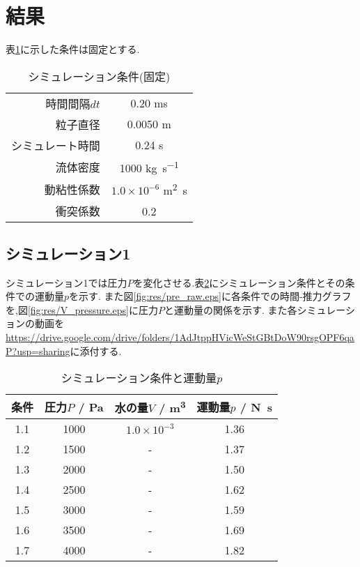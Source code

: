\section{結果}
表\ref{tab:res_keisan}に示した条件は固定とする.
\begin{table}[h]
\caption{シミュレーション条件(固定)}
\label{tab:res_keisan}
\centering
\begin{tabular}{rc}
\hline
時間間隔$dt$&0.20 \si{\milli\second}\\
粒子直径&0.0050 \si{\metre}\\
シミュレート時間&0.24 \si{\second}\\
流体密度&1000 \si{\kilo\gram.\second^{-1}}\\
動粘性係数&$1.0\times10^{-6}$ \si{\metre^2\second}\\
衝突係数&0.2\\
\hline
\end{tabular}
\end{table}
\subsection{シミュレーション1}
シミュレーション1では圧力$P$を変化させる.表\ref{tab:res_sim1}にシミュレーション条件とその条件での運動量$p$を示す.
また図\ref{fig:res/pre_raw.eps}に各条件での時間-推力グラフを,図\ref{fig:res/V_pressure.eps}に圧力$P$と運動量の関係を示す.
また各シミュレーションの動画を\url{https://drive.google.com/drive/folders/1AdJtppHVicWeStGBtDoW90rsgOPF6qaP?usp=sharing}に添付する.
\begin{table}[h]
\caption{シミュレーション条件と運動量$p$}
\label{tab:res_sim1}
\centering
\begin{tabular}{cccc}
\hline
条件&圧力$P$ / \si{\pascal}&水の量$V$ / \si{\metre^3}&運動量$p$ / \si{\newton.\second}\\
\hline\hline
1.1&1000&$1.0\times10^{-3}$&1.36\\
1.2&1500&-&1.37\\
1.3&2000&-&1.50\\
1.4&2500&-&1.62\\
1.5&3000&-&1.59\\
1.6&3500&-&1.69\\
1.7&4000&-&1.82\\
\hline
\end{tabular}
\end{table}
